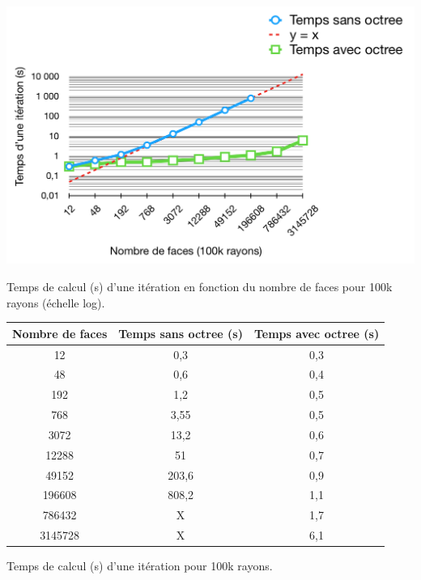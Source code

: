  \begin{figureth}
	\includegraphics[width=\linewidth]{images/complexite1}
	\caption{Temps de calcul (s) d'une itération en fonction du nombre de faces pour 100k rayons (échelle log).}
	\label{complexite1}
\end{figureth}

\begin{tableth}
	\begin{tabular}{| c | c | c |}
			\hline
		Nombre de faces & Temps \textbf{sans} \gls{octree} (s) & Temps \textbf{avec} \gls{octree} (s)\\
		  \hline
		  \hline
		   12 &0,3&	0,3 \\
		   \hline
		48 &0,6	&0,4 \\
		   \hline
		192 & 1,2	&0,5\\
		   \hline
		768 & 3,55&	0,5\\
		   \hline
		3072 & 13,2	&0,6\\
		   \hline
		12288 &51	&0,7 \\
		     \hline
		     49152 & 203,6	&0,9\\
		   \hline
		196608 & 808,2	&1,1\\
		\hline
		786432 & X & 1,7 \\
		\hline
		3145728 & X & 6,1 \\
		\hline
	 \end{tabular}
	\caption{Temps de calcul (s) d'une itération pour 100k rayons.}
	\label{tabComplexite1}
\end{tableth}

\clearpage

